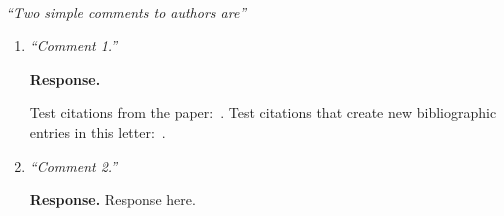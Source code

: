 \documentclass[11pt]{article}
\begin{document}
~\\[.1cm]
\noindent\emph{``Two simple comments to authors are''}
\begin{enumerate}[label=R1.\arabic*] %

\item {\it ``Comment 1.''}

  {\bf Response.}
  \begin{bullets}
  Test citations from the paper:~\cite{P-kay1}.
  Test citations that create new bibliographic entries in this letter:~\cite{wilson2009regularization,wilson2010tomography}.

  \end{bullets}

\begin{bullets}

\begin{bullets}

\begin{bullets}

\begin{bullets}

\begin{bullets}

\begin{bullets}

\begin{bullets}

\begin{bullets}
  
\begin{bullets}
  \end{bullets}

  \end{bullets}

  \end{bullets}

  \end{bullets}

  \end{bullets}

  \end{bullets}

  \end{bullets}

  \end{bullets}

  \end{bullets}
  


\item{\it ``Comment 2.''}

  {\bf Response.} Response here.
\end{enumerate}
\end{document}
